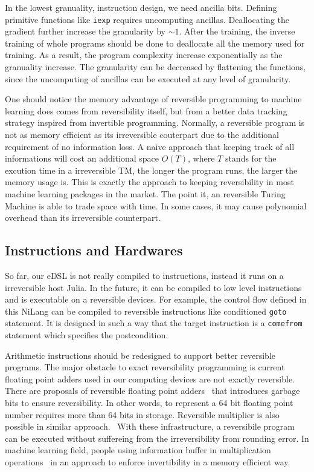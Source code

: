 \documentclass[aps,twocolumn,longbibliography,english,superscriptaddress,prr]{revtex4-1}
\newcommand{\<}{\langle}
\renewcommand{\>}{\rangle}
\theoremstyle{definition}\newtheorem{definition}{\textit{Definition}}
\begin{document}
In the lowest granuality, instruction design, we need ancilla bits. Defining primitive functions like \texttt{iexp} requires uncomputing ancillas. Deallocating the gradient further increase the granularity by $\sim 1$. After the training, the inverse training of whole programs should be done to deallocate all the memory used for training. As a result, the program complexity increase exponentially as the granuality increase.
The granularity can be decreased by flattening the functions, since the uncomputing of ancillas can be executed at any level of granularity.

One should notice the memory advantage of reversible programming to machine learning does comes from reversibility itself, but from a better data tracking strategy inspired from invertible programming.
Normally, a reversible program is not as memory efficient as its irreversible couterpart due to the additional requirement of no information loss. A naive approach that keeping track of all informations will cost an additional space $O(T)$, where $T$ stands for the excution time in a irreversible TM, the longer the program runs, the larger the memory usage is. This is exactly the approach to keeping reversibility in most machine learning packages in the market.
The point it, an reversible Turing Machine is able to trade space with time.
In some cases, it may cause polynomial overhead than its irreversible counterpart.

\subsection{Instructions and Hardwares}\label{sec:instruction}
So far, our eDSL is not really compiled to instructions, instead it runs on a irreversible host Julia.
In the future, it can be compiled to low level instructions and is executable on a reversible devices.
For example, the control flow defined in this NiLang can be compiled to reversible instructions like conditioned \texttt{goto} statement.
It is designed in such a way that the target instruction is a \texttt{comefrom} statement which specifies the postcondition. ~\cite{Vieri1999}

Arithmetic instructions should be redesigned to support better reversible programs.
The major obstacle to exact reversibility programming is current floating point adders used in our computing devices are not exactly reversible.
There are proposals of reversible floating point adders~\cite{Nachtigal2011,Nguyen2013} that introduces garbage bits to ensure reversibility.
In other words, to represent a 64 bit floating point number requires more than 64 bits in storage. Reversible multiplier is also possible in similar approach.~\cite{Nachtigal2010} With these infrastructure, a reversibile program can be executed without suffereing from the irreversibility from rounding error.
In machine learning field, people using information buffer in multiplication operations~\cite{Maclaurin2015} in an approach to enforce invertibility in a memory efficient way.
\end{document}
